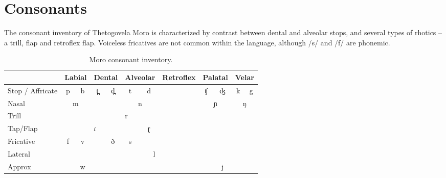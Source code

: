 \section{Consonants}
The consonant inventory of Thetogovela Moro is characterized by contrast between dental and alveolar stops, and several types of rhotics – a trill, flap and retroflex flap. Voiceless fricatives are not common within the language, although /s/ and /f/ are phonemic. 


\begin{table}
	\begin{tabular}[t]{lcccccccccccc}
			\lsptoprule & 
				\multicolumn{2}{c}{{Labial}} &					%
				\multicolumn{2}{c}{{Dental}} & 					%
				\multicolumn{2}{c}{{Alveolar}} & 				%
				\multicolumn{2}{c}{{Retroflex}} & 				%
				\multicolumn{2}{c}{{Palatal}} & 					%
				\multicolumn{2}{c}{{Velar}}  \\
	\midrule		 Stop / Affricate &  									%
				p & b &										%
				{t̪} & {d̪} &									%
				t   &  d  &							%
				{} 		& {} 			&					%
				ʧ 		& ʤ 	&					%
				k & g \\				\midrule				
			 Nasal & 							%
				\multicolumn{2}{c}{m} &													%
				& &								%
				\multicolumn{2}{c}{n} &							%
				&  &														%
				 \multicolumn{2}{c}{ɲ}  &														%
				 \multicolumn{2}{c}{ŋ} 														%
         \\		
			\midrule Trill &  								%
				& {} &											%
				\multicolumn{2}{r}{}&								%
				\multicolumn{2}{l}{r}&								%
				& &														%
				& 														%
				        &         &		%
        \\		%
			\midrule Tap/Flap &  						%
				& &													%
				\multicolumn{2}{l}{{ɾ}} &					%
				& {ɽ} &														%
				& &														%
				        &         	%
    \\		%
			\midrule Fricative & 						%
				{f} & {v} &									%
				{} & {ð } &									%
				s & &													%
				{} & {} &								%
				{{}} & {} &								%
				 & {} 											%
 \\										%
			\midrule Lateral & 							%
				&   &														%
				&								%
				\multicolumn{3}{r}{{l}} & 					%
				&  &											%
				&  & &														%
        \\		%
			\midrule Approx & 							%
				&  w &														%
				&								%
				\multicolumn{3}{l}{{}} &					%
				&  &											%
				& j & &														%
        \\		%
			\bottomrule
		\end{tabular}
  \caption{Moro consonant inventory.}
  \label{tab:ch2:5}
\end{table}


